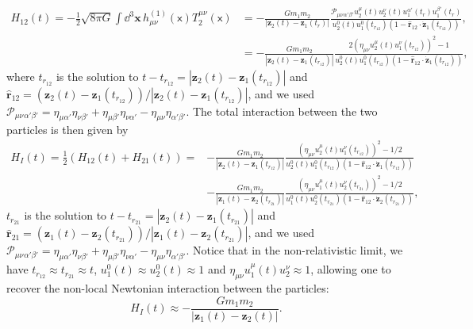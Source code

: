 \documentclass[letterpaper,12pt,titlepage,oneside,final]{book}
\newcommand{\mf}{\mathsf}%
\begin{document}
{\begin{align}
    {H}_{12}(t)  = - \frac{1}{2} \sqrt{8\pi G} \int \dd^3 {\bm x}\, h^{(1)}_{\mu\nu}(\mf x) T_2^{\mu\nu}(\mf x) &=- \frac{G m_1 m_2}{|\bm z_2(t) - \bm z_1(t_r)|} \frac{\mathcal{P}_{\mu\nu}{}_{\alpha'\beta'}u_2^{\mu}(t) u_2^{\nu}(t)u_1^{\alpha'}(t_r) u_1^{\beta'}(t_r)}{u_2^0(t)u_1^0(t_{r_{12}})(1- \hat{\bm r}_{12}\!\cdot\! \dot{\bm z}_1(t_{r_{12}}))},\nonumber\\
    &=- \frac{G m_1 m_2}{|\bm z_2(t) - \bm z_1(t_{r_{12}})|} \frac{2(\eta_{\mu\nu}u_2^{\mu}(t) u_1^{\nu}(t_{r_{12}}))^2-1}{u_2^0(t)u_1^0(t_{r_{12}})(1- \hat{\bm r}_{12}\!\cdot\! \dot{\bm z}_1(t_{r_{12}}))},
\end{align}
where $t_{r_{12}}$ is the solution to $t - t_{r_{12}} = |\bm z_2(t) - \bm z_1(t_{r_{12}})|$ and $\hat{\bm r}_{12} = (\bm z_2(t)  - \bm z_1(t_{r_{12}}))/|\bm z_2(t)  - \bm z_1(t_{r_{12}})|$, and we used $\mathcal{P}_{\mu\nu}{}_{\alpha'\beta'} = \eta_{\mu\alpha'}\eta_{\nu \beta'} + \eta_{\mu \beta'} \eta_{\nu \alpha'} - \eta_{\mu\nu} \eta_{\alpha'\beta'}$. The total interaction between the two particles is then given by
\begin{align}
    H_I(t) = \frac{1}{2}\left(H_{12}(t) + H_{21}(t)\right) =&- \frac{G m_1 m_2}{|\bm z_2(t) - \bm z_1(t_{r_{12}})|}\frac{(\eta_{\mu\nu}u_2^{\mu}(t) u_1^{\nu}(t_{r_{12}}))^2-1/2}{u_2^0(t)u_1^0(t_{r_{12}})(1- \hat{\bm r}_{12}\!\cdot\! \dot{\bm z}_1(t_{r_{12}}))}\\&- \frac{G m_1 m_2}{|\bm z_1(t) - \bm z_2(t_{r_{21}})|} \frac{(\eta_{\mu\nu}u_1^{\mu}(t) u_2^{\nu}(t_{r_{21}}))^2-1/2}{u_1^0(t)u_2^0(t_{r_{21}})(1- \hat{\bm r}_{12}\!\cdot\! \dot{\bm z}_2(t_{r_{21}}))},
\end{align}
$t_{r_{21}}$ is the solution to $t - t_{r_{21}} = |\bm z_2(t) - \bm z_1(t_{r_{21}})|$ and $\hat{\bm r}_{21} = (\bm z_1(t)  - \bm z_2(t_{r_{21}}))/|\bm z_1(t)  - \bm z_2(t_{r_{21}})|$, and we used $\mathcal{P}_{\mu\nu}{}_{\alpha'\beta'} = \eta_{\mu\alpha'}\eta_{\nu \beta'} + \eta_{\mu \beta'} \eta_{\nu \alpha'} - \eta_{\mu\nu} \eta_{\alpha'\beta'}$.
Notice that in the non-relativistic limit, we have $t_{r_{12}}\approx t_{r_{21}} \approx t$, $u_1^0(t) \approx u_2^0(t) \approx 1$ and $\eta_{\mu\nu} u_1^\mu(t)u_2^\nu \approx 1$, allowing one to recover the non-local Newtonian interaction between the particles:
\begin{equation}
    H_I(t)\approx - \frac{G m_1 m_2}{|\bm z_1(t) - \bm z_2(t)|}.
\end{equation}


}
\end{document}
